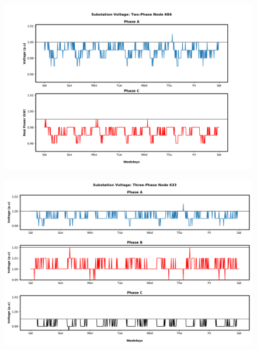 \begin{figure}[H]
    \centering
    \includegraphics[width=1.1\columnwidth]{Pictures/eighty_two_phase_684_volt.png}
    \caption{ }
\end{figure}

\newpage

\begin{figure}[H]
    \centering
    \includegraphics[width=1.1\columnwidth]{Pictures/eighty_three_phase_633_volt.png}
    \caption{ }
\end{figure}

\newpage





